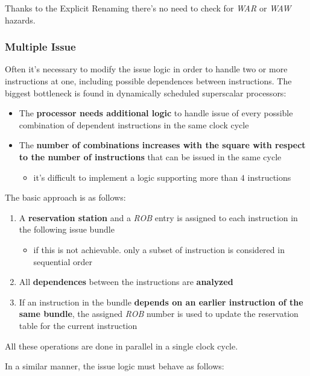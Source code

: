 \documentclass[english]{article}
\begin{document}
\bigskip
Thanks to the Explicit Renaming there's no need to check for \textit{WAR} or \textit{WAW} hazards.

\subsubsection{Multiple Issue}

Often it's necessary to modify the issue logic in order to handle two or more instructions at one, including possible dependences between instructions.
The biggest bottleneck is found in dynamically scheduled superscalar processors:

\begin{itemize}
  \item The \textbf{processor needs additional logic} to handle issue of every possible combination of dependent instructions in the same clock cycle
  \item The \textbf{number of combinations increases with the square with respect to the number of instructions} that can be issued in the same cycle
        \begin{itemize}
          \item it's difficult to implement a logic supporting more than \(4\) instructions
        \end{itemize}
\end{itemize}

\bigskip
The basic approach is as follows:

\begin{enumerate}
  \item A \textbf{reservation station} and a \textit{ROB} entry is assigned to each instruction in the following issue bundle
        \begin{itemize}
          \item if this is not achievable. only a subset of instruction is considered in sequential order
        \end{itemize}
  \item All \textbf{dependences} between the instructions are \textbf{analyzed}
  \item If an instruction in the bundle \textbf{depends on an earlier instruction of the same bundle}, the assigned \textit{ROB} number is used to update the reservation table for the current instruction
\end{enumerate}

All these operations are done in parallel in a single clock cycle.

In a similar manner, the issue logic must behave as follows:
\end{document}
